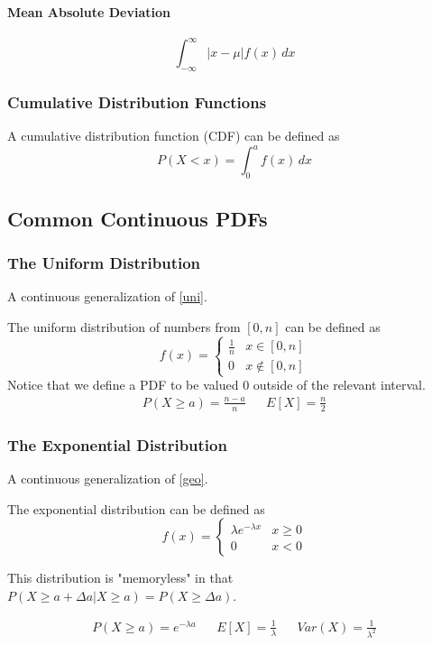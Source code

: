 \documentclass{article}
\begin{document}
\paragraph{Mean Absolute Deviation}
$$\int_{-\infty}^\infty |x-\mu|f(x)\,dx$$

\subsubsection{Cumulative Distribution Functions}
A cumulative distribution function (CDF) can be defined as
$$P(X < x) = \int_0^a f(x)\,dx$$

\subsection{Common Continuous PDFs}
\subsubsection{The Uniform Distribution}
A continuous generalization of \ref{uni}.

The uniform distribution of numbers from $[0, n]$ can be defined as
\[
    f(x) =
    \begin{cases}
        \frac{1}{n} & x \in [0,n] \\
        0 & x \notin [0,n]
    \end{cases}
\]
Notice that we define a PDF to be valued $0$ outside of the relevant interval.
\begin{align*}
    P(X\ge a)=\frac{n-a}{n} &&
    E[X] = \frac{n}{2}
\end{align*}

\subsubsection{The Exponential Distribution}
A continuous generalization of \ref{geo}.

The exponential distribution can be defined as
\[
    f(x) =
    \begin{cases}
        \lambda e^{-\lambda x} & x \ge 0 \\
        0 & x < 0
    \end{cases}
\]

This distribution is "memoryless" in that $P(X \ge a + \Delta a | X \ge a) = P(X \ge \Delta a)$.

\begin{align*}
   P(X\ge a) = e^{-\lambda a}&& E[X] = \frac{1}{\lambda} && Var(X) = \frac{1}{\lambda^2}
\end{align*}
\end{document}
